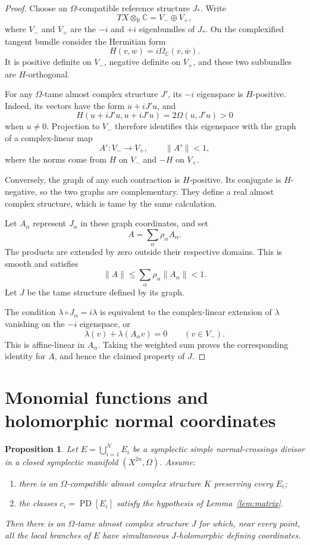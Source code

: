 \documentclass[11pt]{article}
\newtheorem{proposition}[theorem]{Proposition}
\theoremstyle{definition}
\theoremstyle{remark}
\newcommand{\R}{\mathbb R}
\newcommand{\C}{\mathbb C}
\newcommand{\PD}{\operatorname{PD}}
\begin{document}
\begin{proof}
Choose an $\Omega$-compatible reference structure $J_*$.
Write
\[
TX\otimes_{\R}\C=V_-\oplus V_+,
\]
where $V_-$ and $V_+$ are the $-i$ and $+i$ eigenbundles of
$J_*$.  On the complexified tangent bundle consider the
Hermitian form
\[
H(v,w)=i\Omega_{\C}(v,\overline w).
\]
It is positive definite on $V_-$, negative definite on $V_+$,
and these two subbundles are $H$-orthogonal.

For any $\Omega$-tame almost complex structure $J'$, its
$-i$ eigenspace is $H$-positive.  Indeed, its vectors have the
form $u+iJ'u$, and
\[
H(u+iJ'u,u+iJ'u)=2\Omega(u,J'u)>0
\]
when $u\neq0$.  Projection to $V_-$ therefore identifies this
eigenspace with the graph of a complex-linear map
\[
A':V_-\longrightarrow V_+,\qquad \|A'\|<1,
\]
where the norms come from $H$ on $V_-$ and $-H$ on $V_+$.

Conversely, the graph of any such contraction is $H$-positive.
Its conjugate is $H$-negative, so the two graphs are
complementary.  They define a real almost complex structure,
which is tame by the same calculation.

Let $A_\alpha$ represent $J_\alpha$ in these graph coordinates,
and set
\[
A=\sum_\alpha\rho_\alpha A_\alpha.
\]
The products are extended by zero outside their respective
domains.  This is smooth and satisfies
\[
\|A\|\leq\sum_\alpha\rho_\alpha\|A_\alpha\|<1.
\]
Let $J$ be the tame structure defined by its graph.

The condition $\lambda\circ J_\alpha=i\lambda$ is equivalent
to the complex-linear extension of $\lambda$ vanishing on the
$-i$ eigenspace, or
\[
\lambda(v)+\lambda(A_\alpha v)=0
\qquad(v\in V_-).
\]
This is affine-linear in $A_\alpha$.  Taking the weighted sum
proves the corresponding identity for $A$, and hence the
claimed property of $J$.
\end{proof}

\section{Monomial functions and holomorphic normal coordinates}

\begin{proposition}\label{prop:redundant-case}
Let $E=\bigcup_{i=1}^{N}E_i$ be a symplectic simple
normal-crossings divisor in a closed symplectic manifold
$(X^{2n},\Omega)$.  Assume:
\begin{enumerate}[label=\textup{(\alph*)}]
\item there is an $\Omega$-compatible almost complex structure
      $K$ preserving every $E_i$;
\item the classes $c_i=\PD[E_i]$ satisfy the hypothesis of
      Lemma~\ref{lem:matrix}.
\end{enumerate}
Then there is an $\Omega$-tame almost complex structure $J$
for which, near every point, all the local branches of $E$
have simultaneous $J$-holomorphic defining coordinates.
\end{proposition}
\end{document}
